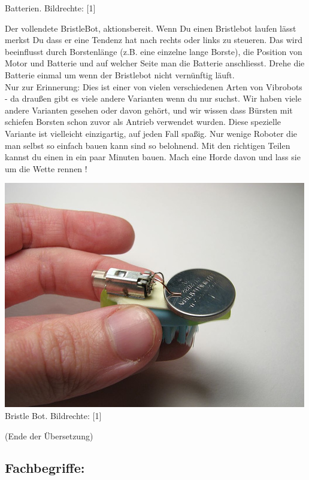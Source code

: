 \documentclass[10pt,a4paper,ngerman,twoside]{article} %
\begin{document}
\begin{multicols}{3}
\begin{center}
\footnotesize{Batterien. Bildrechte: [1]}
\end{center}
Der vollendete BristleBot, aktionsbereit. Wenn Du einen Bristlebot laufen lässt merkst Du dass er eine Tendenz hat nach rechts oder links zu steueren. Das wird beeinflusst durch Borstenlänge (z.B. eine einzelne lange Borste), die Position von Motor und Batterie und auf welcher Seite man die Batterie anschliesst. Drehe die Batterie einmal um wenn der Bristlebot nicht vernünftig läuft.
\\  

Nur zur Erinnerung: Dies ist einer von vielen verschiedenen Arten von Vibrobots - da draußen gibt es viele andere Varianten wenn du nur suchst. Wir haben viele andere Varianten gesehen oder davon gehört, und wir wissen dass Bürsten mit schiefen Borsten schon zuvor als Antrieb verwendet wurden. Diese spezielle Variante ist vielleicht einzigartig, auf jeden Fall spaßig. Nur wenige Roboter die man selbst so einfach bauen kann sind so belohnend. Mit den richtigen Teilen kannst du einen in ein paar Minuten bauen. Mach eine Horde davon und lass sie um die Wette rennen !
\
\begin{center}
\includegraphics[width=\linewidth]{bristlebot/bristlebot14.jpg}
\footnotesize{Bristle Bot. Bildrechte: [1]}
\end{center}

(Ende der Übersetzung) \\

\subsection*{Fachbegriffe:}


\end{multicols}
\end{document}
